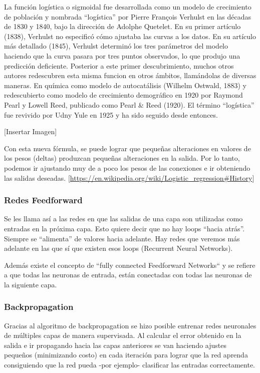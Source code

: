 \documentclass[a4paper]{article}
\begin{document}
La función logística o sigmoidal fue desarrollada como un modelo de crecimiento de población y 
nombrada ``logística'' por Pierre François Verhulst en las décadas de 1830 y 1840, bajo la 
dirección de Adolphe Quetelet.
En su primer artículo (1838), Verhulst no especificó cómo ajustaba las curvas a los datos. 
En su artículo más detallado (1845), Verhulst determinó los tres parámetros del modelo haciendo 
que la curva pasara por tres puntos observados, lo que produjo una predicción deficiente.
Posterior a este primer descubrimiento, muchos otros autores redescubren esta misma funcion 
en otros ámbitos, llamándolas de diversas maneras. En química como modelo de autocatálisis 
(Wilhelm Ostwald, 1883) y redescubierto como modelo de crecimiento demográfico en 1920 por 
Raymond Pearl y Lowell Reed, publicado como Pearl \& Reed (1920). El término ``logística'' 
fue revivido por Udny Yule en 1925 y ha sido seguido desde entonces.

[Insertar Imagen]

Con esta nueva fórmula, se puede lograr que pequeñas alteraciones en valores de los pesos 
(deltas) produzcan pequeñas alteraciones en la salida. Por lo tanto, podemos ir ajustando 
muy de a poco los pesos de las conexiones e ir obteniendo las salidas deseadas.
[\url{https://en.wikipedia.org/wiki/Logistic_regression#History}]

\subsubsection{Redes Feedforward}

Se les llama así a las redes en que las salidas de una capa son utilizadas como entradas en 
la próxima capa. Esto quiere decir que no hay loops ``hacia atrás''. Siempre se ``alimenta'' de 
valores hacia adelante. Hay redes que veremos más adelante en las que sí que existen esos 
loops (Recurrent Neural Networks).

Además existe el concepto de ``fully connected Feedforward Networks`` y se refiere a que todas 
las neuronas de entrada, están conectadas con todas las neuronas de la siguiente capa.

\subsubsection{Backpropagation}

Gracias al algoritmo de backpropagation se hizo posible entrenar redes neuronales de múltiples 
capas de manera supervisada. Al calcular el error obtenido en la salida e ir propagando hacia 
las capas anteriores se van haciendo ajustes pequeños (minimizando costo) en cada iteración 
para lograr que la red aprenda consiguiendo que la red pueda -por ejemplo- clasificar las 
entradas correctamente.
\end{document}

